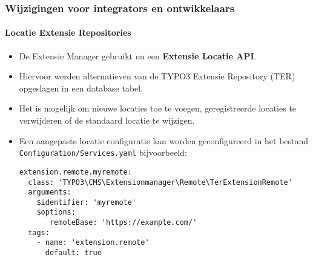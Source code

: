 %

\begin{frame}[fragile]
	\frametitle{Wijzigingen voor integrators en ontwikkelaars}
	\framesubtitle{Locatie Extensie Repositories}


	\begin{itemize}
		\item De Extensie Manager gebruikt nu een \textbf{Extensie Locatie API}.
		\item Hiervoor werden alternatieven van de TYPO3 Extensie Repository (TER)
			opgeslagen in een database tabel.
		\item Het is mogelijk om nieuwe locaties toe te voegen, geregistreerde locaties
		    te verwijderen of de standaard locatie te wijzigen.
		\item Een aangepaste locatie configuratie kan worden geconfigureerd in het bestand
			\small\texttt{Configuration/Services.yaml} bijvoorbeeld:
\begin{lstlisting}
extension.remote.myremote:
  class: 'TYPO3\CMS\Extensionmanager\Remote\TerExtensionRemote'
  arguments:
    $identifier: 'myremote'
    $options:
       remoteBase: 'https://example.com/'
  tags:
    - name: 'extension.remote'
      default: true
\end{lstlisting}

	\end{itemize}

\end{frame}


